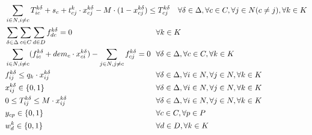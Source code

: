 \documentclass[preprint,review,12pt]{elsarticle}
\begin{document}
\begin{align}
	& \sum\limits_{i \in N, i \ne c} T_{ic}^{k\delta} + s_c +  t_{cj}^k \cdot  x_{cj}^{k\delta} - M \cdot (1-x_{cj}^{k\delta}) \leq T_{cj}^{k\delta} && \text{\hspace{-0cm}} \forall \delta \in \Delta, \forall c \in C, \forall j \in N (c \ne j), \forall k \in K  \label{PCVRP_OrderT}\\
	& \sum\limits_{\delta \in \Delta} \sum\limits_{c \in C} \sum\limits_{d \in D}  f_{dc}^{k\delta} = 0 && \text{\hspace{-1cm}} \forall k \in K \label{PCVRP_LoadIni} \\
	& \sum\limits_{i \in N, i \ne c} (f_{ic}^{k\delta} + dem_c \cdot x_{ci}^{k\delta})-\sum\limits_{j \in N, j \ne c} f_{cj}^{k\delta} = 0 && \text{\hspace{-1cm}} \forall \delta \in \Delta, \forall c \in C, \forall k \in K \label{PCVRP_LoadFlow} \\
	& f_{ij}^{k\delta} \leq q_k \cdot x_{ij}^{k\delta} && \text{\hspace{-1cm}} \forall \delta \in \Delta, \forall i \in N, \forall j \in N, \forall k \in K \label{PCVRP_fdomain} \\
	& x_{ij}^{k\delta} \in\{0,1\} && \text{\hspace{-1cm}} \forall \delta \in \Delta, \forall i \in N, \forall j \in N, \forall k \in K \label{PCVRP_DomainX}\\
	& 0 \leq T_{ij}^{k\delta} \leq M \cdot  x_{ij}^{k\delta} && \text{\hspace{-1cm}} \forall \delta \in \Delta, \forall i \in N, \forall j \in N, \forall k \in K \label{PCVRP_DomainT}\\
	& y_{cp} \in\{0,1\} && \text{\hspace{-1cm}} \forall c \in C, \forall p \in P \label{PCVRP_DomainY}\\
	& w_d^k \in\{0,1\} && \text{\hspace{-1cm}} \forall d \in D, \forall k \in K \label{PCVRP_DomainW}
\end{align}
\end{document}
